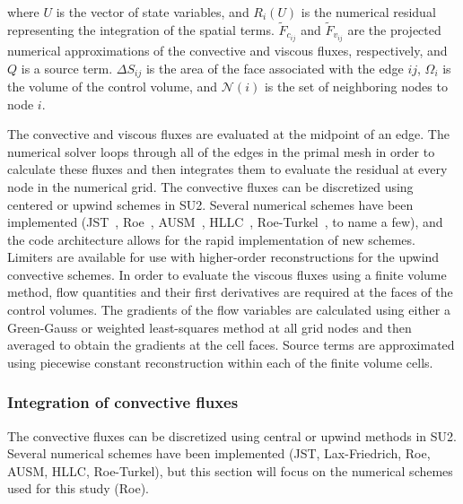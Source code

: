 where $U$ is the vector of state variables, and $R_i(U)$ is the numerical residual representing the integration of the spatial terms. $\tilde{F}_{c_{ij}}$ and $\tilde{F}_{v_{ij}}$ are the projected numerical approximations of the convective and viscous fluxes, respectively, and $Q$ is a source term. $\Delta{S}_{ij}$ is the area of the face associated with the edge $ij$, $\Omega_i$ is the volume of the control volume, and $\mathcal{N}(i)$ is the set of neighboring nodes to node $i$.

The convective and viscous fluxes are evaluated at the midpoint of an edge. The numerical solver loops through all of the edges in the primal mesh in order to calculate these fluxes and then integrates them to evaluate the residual at every node in the numerical grid. The convective fluxes can be discretized using centered or upwind schemes in SU2. Several numerical schemes have been implemented (JST~\cite{jameson1981}, Roe~\cite{roe1981}, AUSM~\cite{liou93}, HLLC~\cite{toro1999}, Roe-Turkel~\cite{turkel_1}, to name a few), and the code architecture allows for the rapid implementation of new schemes. Limiters are available for use with higher-order reconstructions for the upwind convective schemes. In order to evaluate the viscous fluxes using a finite volume method, flow quantities and their first derivatives are required at the faces of the control volumes. The gradients of the flow variables are calculated using either a Green-Gauss or weighted least-squares method at all grid nodes and then averaged to obtain the gradients at the cell faces. Source terms are approximated using piecewise constant reconstruction within each of the finite volume cells.

\subsubsection*{Integration of convective fluxes}

The convective fluxes can be discretized using central or upwind methods in SU2. Several numerical schemes have been implemented (JST, Lax-Friedrich, Roe, AUSM, HLLC, Roe-Turkel), but this section will focus on the numerical schemes used for this study (Roe).

